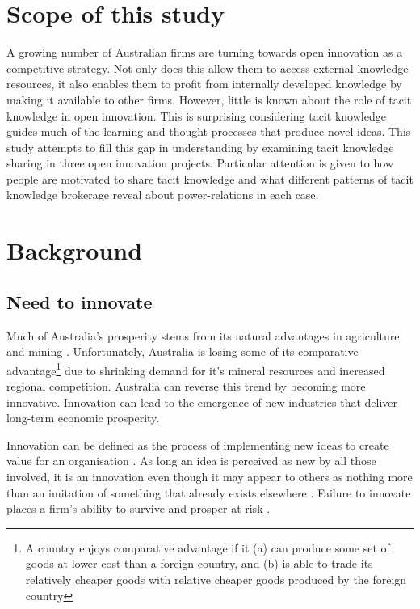 
\section{Scope of this study}

A growing number of Australian firms are turning towards open innovation as a competitive strategy. Not only does this allow them to access external knowledge resources, it also enables them to profit from internally developed knowledge by making it available to other firms. However, little is known about the role of tacit knowledge in open innovation. This is surprising considering tacit knowledge guides much of the learning and thought processes that produce novel ideas. This study attempts to fill this gap in understanding by examining tacit knowledge sharing in three open innovation projects. Particular attention is given to how people are motivated to share tacit knowledge and what different patterns of tacit knowledge brokerage reveal about power-relations in each case. \medskip

\section{Background}

\subsection{Need to innovate}

Much of Australia's prosperity stems from its natural advantages in agriculture and mining \citep{leung2016view}. Unfortunately, Australia is losing some of its comparative advantage\footnote{A country enjoys comparative advantage if it (a) can produce some set of goods at lower cost than a foreign country, and (b) is able to trade its relatively cheaper goods with relative cheaper goods produced by the foreign country} due to shrinking demand for it's mineral resources and increased regional competition. Australia can reverse this trend by becoming more innovative. Innovation can lead to the emergence of new industries that deliver long-term economic prosperity. \medskip

Innovation can be defined as the process of implementing new ideas to create value for an organisation \citep{schumpeter1950capitalism}. As long an idea is perceived as new by all those involved, it is an innovation even though it may appear to others as nothing more than an imitation of something that already exists elsewhere \citep{van1986central}. Failure to innovate places a firm’s ability to survive and prosper at risk \citep{bessant2005managing}. \medskip

